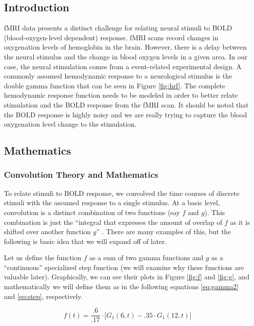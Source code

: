 
\subsection{Introduction}

fMRI data presents a distinct challenge for relating neural stimuli 
to BOLD (blood-oxygen-level dependent) response. fMRI scans record changes 
in oxygenation levels of hemoglobin in the brain. However, there is a delay 
between the neural stimulus and the change in blood oxygen levels in a given 
area. In our case, the neural stimulation comes from a event-related 
experimental design. A commonly assumed hemodynamic response to a neurological 
stimulus is the double gamma function that can be seen in Figure 
\ref{fig:hrf}. The complete hemodynamic response function needs to be modeled 
in order to better relate stimulation and the BOLD response from the fMRI scan.
It should be noted that the BOLD response is highly noisy and we are really 
trying to capture the blood oxygenation level change to the stimulation.

\subsection{Mathematics}
\subsubsection{Convolution Theory and Mathematics}

To relate stimuli to BOLD response, we convolved the time courses of discrete 
stimuli with the assumed response to a single stimulus. At a basic 
level, convolution is a distinct combination of two functions (say $f$ and 
$g$). This combination is just the ``integral that expresses the amount of 
overlap of $f$ as it is shifted over another function $g$'' 
\cite{weissten2015convolution}. 
There are many examples of this, but the following is basic idea that we will 
expand off of later. 

Let us define the function $f$ as a sum of two gamma functions and $g$ as a 
``continuous'' specialized step function (we will examine why these functions 
are valuable later). Graphically, we can see their plots in Figure \ref{fig:f}
and \ref{fig:g}, and mathematically we will define them as in the following 
equations \ref{eq:gamma2} and \ref{eq:step}, respectively.

\begin{equation} \label{eq:gamma2}
f(t)=\frac{.6}{.17}\cdot  \big[G_1(6,t)-.35 \cdot G_1(12,t) \big]
\end{equation}

